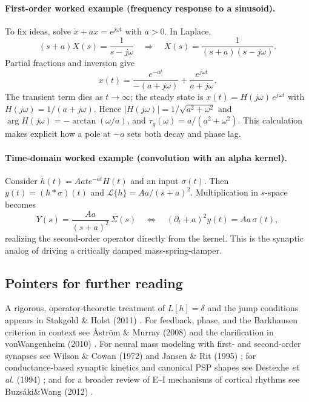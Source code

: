 \paragraph{First-order worked example (frequency response to a sinusoid).}
To fix ideas, solve \(\dot x + a x = e^{j\omega t}\) with \(a>0\). In Laplace,
\[
(s+a)X(s)=\frac{1}{s-j\omega}\quad\Rightarrow\quad
X(s)=\frac{1}{(s+a)(s-j\omega)}.
\]
Partial fractions and inversion give
\[
x(t)=\frac{e^{-a t}}{-(a+j\omega)}+\frac{e^{j\omega t}}{a+j\omega}.
\]
The transient term dies as \(t\to\infty\); the steady state is \(x(t)=H(j\omega)\,e^{j\omega t}\) with \(H(j\omega)=1/(a+j\omega)\). Hence \(|H(j\omega)|=1/\sqrt{a^2+\omega^2}\) and \(\arg H(j\omega)=-\arctan(\omega/a)\), and \(\tau_g(\omega)=a/(a^2+\omega^2)\). This calculation makes explicit how a pole at \(-a\) sets both decay and phase lag.

\paragraph{Time-domain worked example (convolution with an alpha kernel).}
Consider \(h(t)=A a t e^{-a t}H(t)\) and an input \(\sigma(t)\). Then \(y(t)=(h*\sigma)(t)\) and \(\mathcal{L}\{h\}=A a/(s+a)^2\). Multiplication in \(s\)-space becomes
\[
Y(s)=\frac{A a}{(s+a)^2}\,\Sigma(s)\quad\Longleftrightarrow\quad
\left(\partial_t+a\right)^2 y(t)=A a\,\sigma(t),
\]
realizing the second‑order operator directly from the kernel. This is the synaptic analog of driving a critically damped mass-spring-damper.

\subsection*{Pointers for further reading}
A rigorous, operator‑theoretic treatment of \(L[h]=\delta\) and the jump conditions appears in  Stakgold \& Holst (2011)  \cite{StakgoldHolst2011}. For feedback, phase, and the Barkhausen criterion in context see {\AA str\"om \& Murray (2008)} \cite{AstromMurray2008} and the clarification in  vonWangenheim (2010) \cite{vonWangenheim2010}. For neural mass modeling with first‑ and second‑order synapses see  Wilson \& Cowan (1972)  \cite{WilsonCowan1972} and  Jansen \& Rit (1995) \cite{jansen1995}; for conductance‑based synaptic kinetics and canonical PSP shapes see  Destexhe\textit{ et al.} (1994) \cite{destexhe1994}; and for a broader review of E--I mechanisms of cortical rhythms see Buzs\'aki\&Wang (2012)  \cite{BuzsakiWang2012}.


\clearpage
